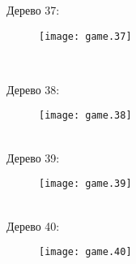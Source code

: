 \documentclass[pdftex,12pt,a4paper]{article}
\begin{document}
Дерево 37: \\
\begin{figure}[htbp]
    \texttt{[image: game.37]}
\end{figure}\\

\newpage

Дерево 38: \\
\begin{figure}[htbp]
    \texttt{[image: game.38]}
\end{figure}\\

Дерево 39: \\
\begin{figure}[htbp]
    \texttt{[image: game.39]}
\end{figure}\\

Дерево 40: \\
\begin{figure}[htbp]
    \texttt{[image: game.40]}
\end{figure}\\
\end{document}
